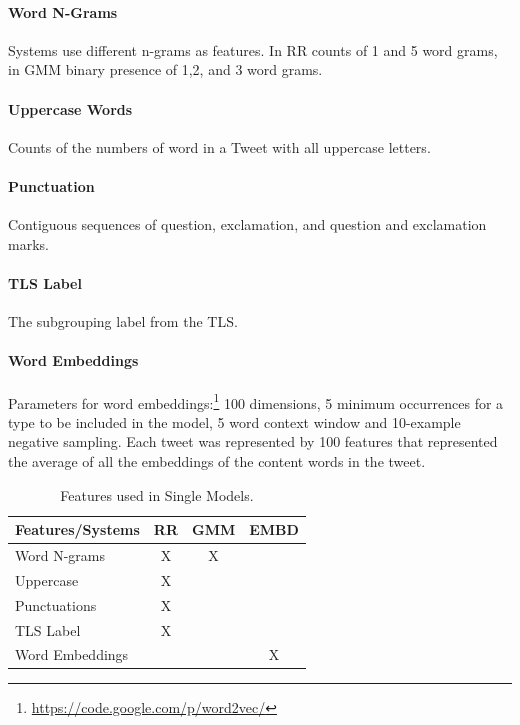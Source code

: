 \documentclass[11pt,letterpaper]{article}
\begin{document}
\paragraph{Word N-Grams}
Systems use different n-grams as features. In {\sc RR} counts of 1 and 5 word grams, in GMM binary presence of 1,2, and 3 word grams.

\paragraph{Uppercase Words} Counts of the numbers of word in a Tweet with all uppercase letters.

\paragraph{Punctuation} Contiguous sequences of question, exclamation, and question and exclamation marks.

\paragraph{TLS Label} The subgrouping label from the TLS.

\paragraph{Word Embeddings}
Parameters for word embeddings:\footnote{\url{https://code.google.com/p/word2vec/}} 100 dimensions, 5 minimum occurrences for a type to be included in the model, 5 word context window and 10-example negative sampling. Each tweet was represented by 100 features that represented the average of all the embeddings of the content words in the tweet. %
\begin{table}[ht!]\centering

\begin{tabular}{l || c c c}
Features/Systems & {\sc RR} & GMM  &EMBD \\
\hline
Word N-grams & X & X & \\
Uppercase & X& \\
Punctuations &X  & \\
TLS Label & X &\\
Word Embeddings & & &X\\
\end{tabular}
\caption{Features used in Single Models.}
\label{tbl:featuresTable}
\end{table}
\end{document}
